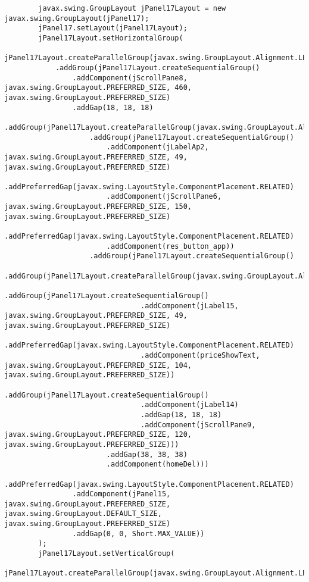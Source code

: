\documentclass[12pt,a4paper]{article}
\begin{document}
\begin{lstlisting}
        javax.swing.GroupLayout jPanel17Layout = new javax.swing.GroupLayout(jPanel17);
        jPanel17.setLayout(jPanel17Layout);
        jPanel17Layout.setHorizontalGroup(
            jPanel17Layout.createParallelGroup(javax.swing.GroupLayout.Alignment.LEADING)
            .addGroup(jPanel17Layout.createSequentialGroup()
                .addComponent(jScrollPane8, javax.swing.GroupLayout.PREFERRED_SIZE, 460, javax.swing.GroupLayout.PREFERRED_SIZE)
                .addGap(18, 18, 18)
                .addGroup(jPanel17Layout.createParallelGroup(javax.swing.GroupLayout.Alignment.LEADING)
                    .addGroup(jPanel17Layout.createSequentialGroup()
                        .addComponent(jLabelAp2, javax.swing.GroupLayout.PREFERRED_SIZE, 49, javax.swing.GroupLayout.PREFERRED_SIZE)
                        .addPreferredGap(javax.swing.LayoutStyle.ComponentPlacement.RELATED)
                        .addComponent(jScrollPane6, javax.swing.GroupLayout.PREFERRED_SIZE, 150, javax.swing.GroupLayout.PREFERRED_SIZE)
                        .addPreferredGap(javax.swing.LayoutStyle.ComponentPlacement.RELATED)
                        .addComponent(res_button_app))
                    .addGroup(jPanel17Layout.createSequentialGroup()
                        .addGroup(jPanel17Layout.createParallelGroup(javax.swing.GroupLayout.Alignment.LEADING)
                            .addGroup(jPanel17Layout.createSequentialGroup()
                                .addComponent(jLabel15, javax.swing.GroupLayout.PREFERRED_SIZE, 49, javax.swing.GroupLayout.PREFERRED_SIZE)
                                .addPreferredGap(javax.swing.LayoutStyle.ComponentPlacement.RELATED)
                                .addComponent(priceShowText, javax.swing.GroupLayout.PREFERRED_SIZE, 104, javax.swing.GroupLayout.PREFERRED_SIZE))
                            .addGroup(jPanel17Layout.createSequentialGroup()
                                .addComponent(jLabel14)
                                .addGap(18, 18, 18)
                                .addComponent(jScrollPane9, javax.swing.GroupLayout.PREFERRED_SIZE, 120, javax.swing.GroupLayout.PREFERRED_SIZE)))
                        .addGap(38, 38, 38)
                        .addComponent(homeDel)))
                .addPreferredGap(javax.swing.LayoutStyle.ComponentPlacement.RELATED)
                .addComponent(jPanel15, javax.swing.GroupLayout.PREFERRED_SIZE, javax.swing.GroupLayout.DEFAULT_SIZE, javax.swing.GroupLayout.PREFERRED_SIZE)
                .addGap(0, 0, Short.MAX_VALUE))
        );
        jPanel17Layout.setVerticalGroup(
            jPanel17Layout.createParallelGroup(javax.swing.GroupLayout.Alignment.LEADING)

\end{lstlisting}
\end{document}
